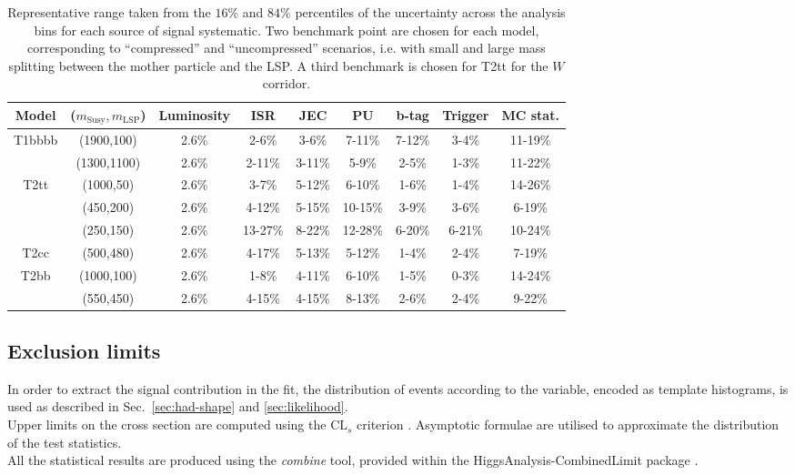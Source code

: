 \begin{table}[h!]
    \caption{Representative range taken from the $16\%$ and $84\%$ percentiles
        of the uncertainty across the analysis bins for each source of signal
        systematic. Two benchmark point are chosen for each model, corresponding
        to ``compressed'' and ``uncompressed'' scenarios, i.e. with small and
        large mass splitting between the mother particle and the LSP. A third
        benchmark is chosen for T2tt for the $W$ corridor.}
    \label{tab:sig-systematics}
    \centering
    \begin{tabular}{ ccccccccc }
        \hline \hline
        Model & ($m_{\mathrm{Susy}},m_{\mathrm{LSP}}$) & Luminosity & ISR & JEC & PU & b-tag & Trigger & MC stat. \\ \hline
        \multirow{2}{*}{T1bbbb}
            & (1900,100)  & 2.6\% & 2-6\%  & 3-6\%  & 7-11\% & 7-12\% & 3-4\% & 11-19\% \\ 
            & (1300,1100) & 2.6\% & 2-11\% & 3-11\% & 5-9\%  & 2-5\%  & 1-3\% & 11-22\% \\
        \hline
        \multirow{2}{*}{T2tt}
            & (1000,50) & 2.6\% & 3-7\%   & 5-12\% & 6-10\%  & 1-6\%  & 1-4\%  & 14-26\% \\ 
            & (450,200) & 2.6\% & 4-12\%  & 5-15\% & 10-15\% & 3-9\%  & 3-6\%  & 6-19\%  \\
            & (250,150) & 2.6\% & 13-27\% & 8-22\% & 12-28\% & 6-20\% & 6-21\% & 10-24\% \\
        \hline
        \multirow{1}{*}{T2cc}
            & (500,480) & 2.6\% & 4-17\% & 5-13\% & 5-12\% & 1-4\% & 2-4\% & 7-19\% \\
        \hline
        \multirow{2}{*}{T2bb}
            & (1000,100) & 2.6\% & 1-8\%  & 4-11\% & 6-10\% & 1-5\% & 0-3\% & 14-24\% \\ 
            & (550,450)  & 2.6\% & 4-15\% & 4-15\% & 8-13\% & 2-6\% & 2-4\% & 9-22\%  \\
        \hline \hline
    \end{tabular}
\end{table}


\subsection{Exclusion limits}
\label{sec:susy_results}
In order to extract the signal contribution in the fit, the distribution of
events according to the \mht variable, encoded as template histograms, is used
as described in Sec.~\ref{sec:had-shape} and \ref{sec:likelihood}. \\
Upper limits on the cross section are computed using the $\text{CL}_{s}$
criterion \cite{CLsTechnique}. Asymptotic formulae \cite{AsymptoticFormulae} are
utilised to approximate the distribution of the test statistics. \\
All the statistical results are produced using the \textit{combine} tool,
provided within the HiggsAnalysis-CombinedLimit package \cite{Combine}.

